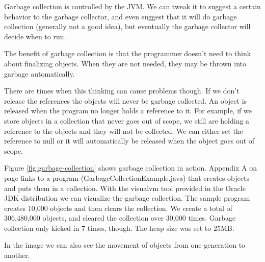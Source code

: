 Garbage collection is controlled by the JVM. We can tweak it to suggest a certain behavior to the garbage collector, and even suggest that it will do garbage collection (generally not a good idea), but eventually the garbage collector will decide when to run.

The benefit of garbage collection is that the programmer doesn't need to think about finalizing objects. When they are not needed, they may be thrown into garbage automatically.

There are times when this thinking can cause problems though. If we don't release the references the objects will never be garbage collected. An object is released when the program no longer holds a reference to it. For example, if we store objects in a collection that never goes out of scope, we still are holding a reference to the objects and they will not be collected. We can either set the reference to null or it will automatically be released when the object goes out of scope.

Figure \ref{fig:garbage-collection} shows garbage collection in action. Appendix A on page \pageref{App:AppendixA} links to a program (GarbageCollectionExample.java) that creates objects and puts them in a collection. With the visualvm tool provided in the Oracle JDK distribution we can vizualize the garbage collection\cite{garbagecollection}. The sample program creates 10,000 objects and then clears the collection. We create a total of 306,480,000 objects, and cleared the collection over 30,000 times. Garbage collection only kicked in 7 times, though. The heap size was set to 25MB. 

In the image we can also see the movement of objects from one generation to another.
